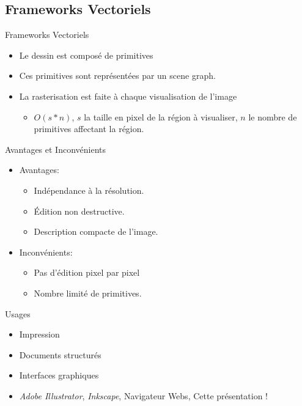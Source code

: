 \documentclass[slidetop,compress,mathserif]{beamer}
\begin{document}
	\subsection{Frameworks Vectoriels}
	\begin{frame}{Frameworks Vectoriels}
		\begin{itemize}
		\item Le dessin est composé de primitives
		\item Ces primitives sont représentées par un scene graph.
		\item La rasterisation est faite à chaque visualisation de l'image 
			\pause
			\begin{itemize}
				\item $O(s*n)$, $s$ la taille en pixel de la région à visualiser, $n$
				le nombre de primitives affectant la région.
			\end{itemize}
		\end{itemize}
	\end{frame}
	\begin{frame}{Avantages et Inconvénients}
		\begin{itemize}
			\item Avantages: 
			\begin{itemize}
				\item Indépendance à la résolution.
				\item Édition non destructive.
				\item Description compacte de l'image.
			\end{itemize}
			\pause
			\item Inconvénients: 
			\begin{itemize}
				\item Pas d'édition pixel par pixel
				\item Nombre limité de primitives. 
			\end{itemize}
		\end{itemize}
	\end{frame}
	
	\begin{frame}{Usages}
		\begin{itemize}
			\item Impression
			\item Documents structurés
			\item Interfaces graphiques
			\pause
			\item \emph{Adobe Illustrator}, \emph{Inkscape}, Navigateur Webs, Cette présentation ! 

		\end{itemize}
	\end{frame}
\end{document}
